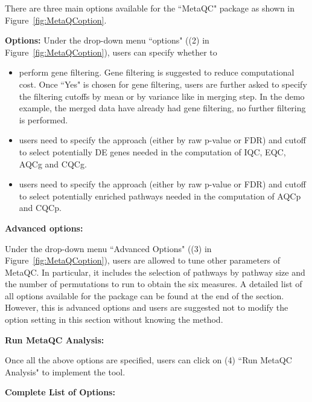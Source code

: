 There are three main options available for the ``MetaQC" package as shown in Figure~\ref{fig:MetaQCoption}. 

\begin{steps}
\item \textbf{Options:}
Under the drop-down menu ``options" ({\color{red}(2)} in Figure~\ref{fig:MetaQCoption}),
users can specify whether to 

\begin{itemize}
\item perform gene filtering. Gene filtering is suggested to reduce computational cost. Once ``Yes" is chosen for gene filtering, users are further asked to specify the filtering cutoffs by mean or by variance like in merging step. In the demo example, the merged data have already had gene filtering, no further filtering is performed. 
\item users need to specify the approach (either by raw p-value or FDR) and cutoff to select potentially DE genes needed in the computation of IQC, EQC, AQCg and CQCg.
\item users need to specify the approach (either by raw p-value or FDR) and cutoff to select potentially enriched pathways needed in the computation of AQCp and CQCp.
\end{itemize}

\item \textbf{Advanced options:}

Under the drop-down menu ``Advanced Options" ({\color{red}(3)} in Figure~\ref{fig:MetaQCoption}), users are allowed to tune other parameters of MetaQC.
In particular, it includes the selection of pathways by pathway size and the number of permutations to run to obtain the six measures. A detailed list of all options available for the package can be found at the end of the section. 
However, this is advanced options and users are suggested not to modify the option setting in this section without knowing the method. 

\item \textbf{Run MetaQC Analysis:}

Once all the above options are specified, users can click on {\color{red}(4)} ``Run MetaQC Analysis" to implement the tool. 

\end{steps}


\textbf{Complete List of Options:} 

